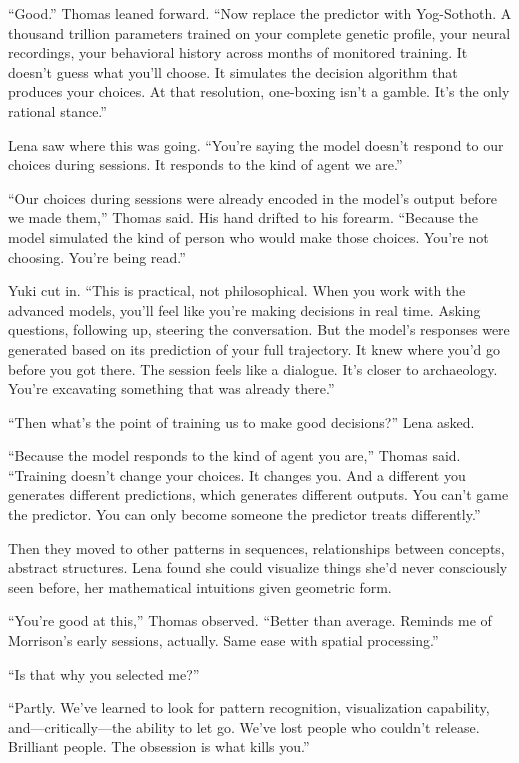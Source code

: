 ``Good.'' Thomas leaned forward. ``Now replace the predictor with Yog-Sothoth. A thousand trillion parameters trained on your complete genetic profile, your neural recordings, your behavioral history across months of monitored training. It doesn't guess what you'll choose. It simulates the decision algorithm that produces your choices. At that resolution, one-boxing isn't a gamble. It's the only rational stance.''

Lena saw where this was going. ``You're saying the model doesn't respond to our choices during sessions. It responds to the kind of agent we are.''

``Our choices during sessions were already encoded in the model's output before we made them,'' Thomas said. His hand drifted to his forearm. ``Because the model simulated the kind of person who would make those choices. You're not choosing. You're being read.''

Yuki cut in. ``This is practical, not philosophical. When you work with the advanced models, you'll feel like you're making decisions in real time. Asking questions, following up, steering the conversation. But the model's responses were generated based on its prediction of your full trajectory. It knew where you'd go before you got there. The session feels like a dialogue. It's closer to archaeology. You're excavating something that was already there.''

``Then what's the point of training us to make good decisions?'' Lena asked.

``Because the model responds to the kind of agent you are,'' Thomas said. ``Training doesn't change your choices. It changes you. And a different you generates different predictions, which generates different outputs. You can't game the predictor. You can only become someone the predictor treats differently.''

Then they moved to other patterns in sequences, relationships between concepts, abstract structures. Lena found she could visualize things she'd never consciously seen before, her mathematical intuitions given geometric form.

``You're good at this,'' Thomas observed. ``Better than average. Reminds me of Morrison's early sessions, actually. Same ease with spatial processing.''

``Is that why you selected me?''

``Partly. We've learned to look for pattern recognition, visualization capability, and—critically—the ability to let go. We've lost people who couldn't release. Brilliant people. The obsession is what kills you.''

